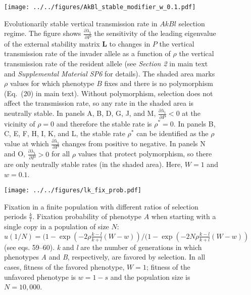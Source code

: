 \documentclass[9pt, a4paper]{extarticle}
\begin{document}
\begin{figure}
\centering
\texttt{[image: ../../figures/AkBl\_stable\_modifier\_w\_0.1.pdf]}
 \caption{Evolutionarily stable vertical transmission rate in $AkBl$ selection regime.
 The figure shows $\frac{\partial \lambda_1}{\partial P}$ the sensitivity of the leading eigenvalue of the external stability matrix $\mathbf{L}$ to changes in $P$ the vertical transmission rate of the invader allele as a function of $\rho$ the vertical transmission rate of the resident allele (see \emph{Section 2} in main text and \emph{Supplemental Material SP6} for details).
 The shaded area marks $\rho$ values for which phenotype $B$ fixes and there is no polymorphism (Eq.~(20) in main text).
 Without polymorphism, selection does not affect the transmission rate, so any rate in the shaded area is neutrally stable.
 In panels A, B, D, G, J, and M, $\frac{\partial \lambda_1}{\partial P} < 0$ at the vicinity of $\rho=0$ and therefore the stable rate is $\rho^*=0$.
 In panels B, C, E, F, H, I, K, and L, the stable rate $\rho^*$ can be identified as the $\rho$ value at which $\frac{\partial \lambda_1}{\partial P}$ changes from positive to negative.
 In panels N and O, $\frac{\partial \lambda_1}{\partial P} > 0$ for all $\rho$ values that protect polymorphism, so there are only neutrally stable rates (in the shaded area).
   Here, $W=1$ and $w=0.1$.}\label{fig:AkBl_stable_modifier_w_0.1}
\end{figure}

\begin{figure}
\centering
\texttt{[image: ../../figures/lk\_fix\_prob.pdf]}
\caption{Fixation in a finite population with different ratios of selection periods \(\frac{k}{l}\). Fixation probability of phenotype $A$ when starting with a single copy in a population of size $N$: $u(1/N) = (1-\exp(-2 \rho \frac{k-l}{k+l}(W-w))/(1-\exp(-2 N \rho \frac{k-l}{k+l}(W-w))$ (see eqs. 59--60).
\emph{k} and \emph{l} are the number of
generations in which phenotypes \emph{A} and \emph{B}, respectively, are favored by
selection. In all cases, fitness of the favored phenotype, $W = 1$; fitness of the unfavored phenotype is $w=1-s$ and the population size is \(N=10,000\).} \label{lk_fix_prob}
\end{figure}
\end{document}
